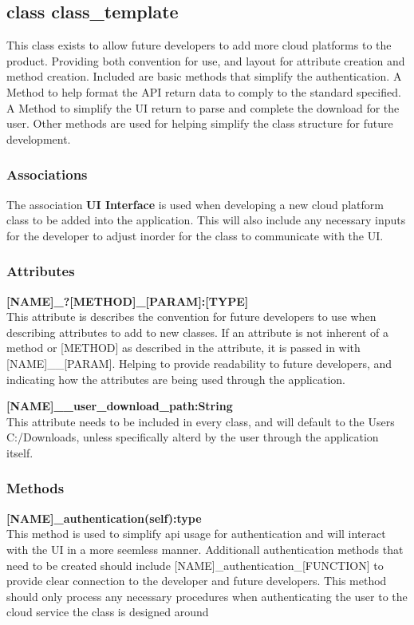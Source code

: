 \subsection{class class\_template}
This class exists to allow future developers to add more cloud platforms to the product. Providing both convention for use, and layout 
for attribute creation and method creation. Included are basic methods that simplify the authentication. A Method to help format the 
API return data to comply to the standard specified. A Method to simplify the UI return to parse and complete the download for the user.
Other methods are used for helping simplify the class structure for future development. 
​
\subsubsection{Associations}
The association \textbf{UI Interface} is used when developing a new cloud platform class to be added into the application. This will also 
include any necessary inputs for the developer to adjust inorder for the class to communicate with the UI. 
​

\subsubsection{Attributes}
\textbf{[NAME]\_?[METHOD]\_[PARAM]:[TYPE]} \\
This attribute is describes the convention for future developers to use when describing attributes to add to new classes. 
If an attribute is not inherent of a method or [METHOD] as described in the attribute, it is passed in with [NAME]\_\_[PARAM].
Helping to provide readability to future developers, and indicating how the attributes are being used through the application.

\textbf{[NAME]\_\_user\_download\_path:String} \\
This attribute needs to be included in every class, and will default to the Users C:/Downloads, unless specifically alterd by the user 
through the application itself. 

\subsubsection{Methods}
\textbf{[NAME]\_authentication(self):type} \\
This method is used to simplify api usage for authentication and will interact with the UI in a more seemless manner. Additionall authentication
methods that need to be created should include [NAME]\_authentication\_[FUNCTION] to provide clear connection to the developer and future 
developers. This method should only process any necessary procedures when authenticating the user to the cloud service the class is designed around

